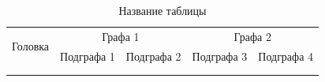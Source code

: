 \noindent
\begin{table}[htbp]
	\caption{Название таблицы}
	\begin{tabularx}{\textwidth}{|X|X|X|X|X|}
		\hline 
		\multirow{2}{*}{Головка} 
		& \multicolumn{2}{c|}{Графа 1} & \multicolumn{2}{c|}{Графа 2} \\
		\cline{2-5}
  		& Подграфа 1 & Подграфа 2 & Подграфа 3 & Подграфа 4 \\ 
		\hline
  		&   &   &   &  \\ 
		\hline
  		&   &   &   &  \\ 
		\hline 
	\end{tabularx}
\end{table}




